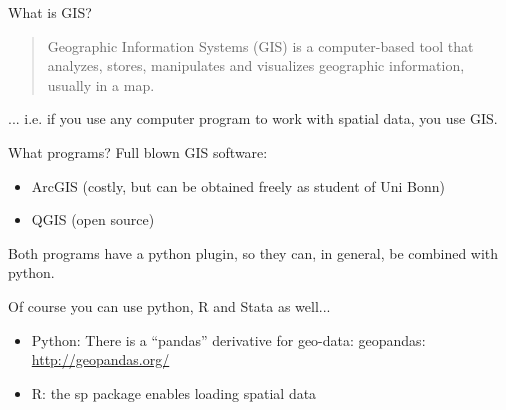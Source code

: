 \begin{frame}{What is GIS?}
	\hspace{2pt}
\begin{quote}
	Geographic Information Systems (GIS) is a computer-based tool that analyzes, stores, manipulates and visualizes geographic information, usually in a map.
\end{quote}

	\hspace{6pt}
	

	
... i.e. if you use any computer program to work with spatial data, you use GIS.
	
\end{frame}


\begin{frame}{What programs?}
	\alert{Full blown GIS software}:
	\begin{itemize}
		\item ArcGIS (costly, but can be obtained freely as student of Uni Bonn) 
		\item QGIS (open source)
	\end{itemize}
	
	Both programs have a python plugin, so they can, \alert{in general}, be combined with python. \\
	\hspace{2pt}
	\pause
	
	\alert{Of course you can use python, R and Stata as well...} \\
	\hspace{2pt}
	
	\begin{itemize}
		\item Python: There is a ``pandas'' derivative for geo-data: \alert{geopandas}: \url{http://geopandas.org/}
		\item R: the sp package enables loading spatial data
	\end{itemize}
	
\end{frame}

